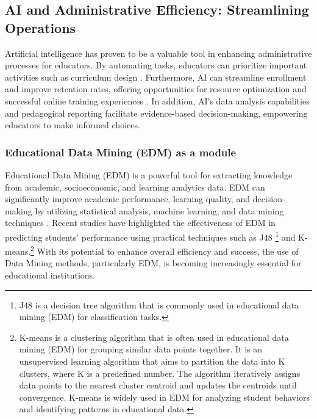 \subsection{AI and Administrative Efficiency: Streamlining Operations}
Artificial intelligence has proven to be a valuable tool in enhancing administrative processes for educators.
By automating tasks, educators can prioritize important activities such as curriculum design \citep{drach_use_2023}.
Furthermore, AI can streamline enrollment and improve retention rates, offering opportunities for resource optimization
and successful online training experiences \citep{lukianets_promises_2023}. In addition, AI's data analysis capabilities
and pedagogical reporting facilitate evidence-based decision-making, empowering educators to make informed choices\citep{guerrero-quinonez_artificial_2023}.

\subsubsection{Educational Data Mining (EDM) as a module}

Educational Data Mining (EDM) is a powerful tool for extracting knowledge from academic, socioeconomic,
and learning analytics data. EDM can significantly improve academic performance, learning quality,
and decision-making by utilizing statistical analysis, machine learning, and data mining techniques \citep{hooda_integrating_2022, arifin_using_2022}.
Recent studies have highlighted the effectiveness of EDM in predicting students' performance using
practical techniques such as J48 \footnote{J48 is a decision tree algorithm that is commonly used in
	educational data mining (EDM) for classification tasks.} and K-means.\footnote{ K-means is a clustering algorithm that is often used in educational data mining
	(EDM) for grouping similar data points together. It is an unsupervised learning algorithm that aims to partition the data into K clusters, where K is a predefined number.
	The algorithm iteratively assigns data points to the nearest cluster centroid and updates the centroids until convergence.
	K-means is widely used in EDM for analyzing student behaviors and identifying patterns in educational data.}
With its potential to enhance overall efficiency and success\citep{prince_sattam_bin_abdulaziz_university_state_2016},
the use of Data Mining methods, particularly EDM, is becoming increasingly essential for educational institutions.

